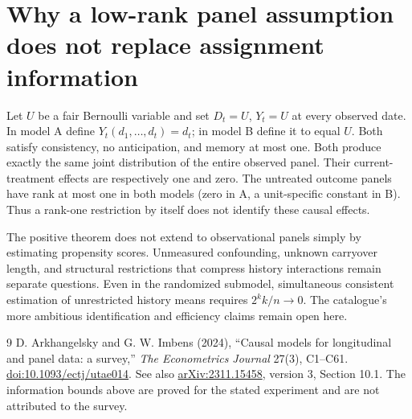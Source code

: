 \documentclass[11pt,a4paper]{article}
\theoremstyle{remark}
\begin{document}
\section{Why a low-rank panel assumption does not replace assignment information}
Let $U$ be a fair Bernoulli variable and set $D_t=U$, $Y_t=U$ at every observed date. In model A define $Y_t(d_1,\ldots,d_t)=d_t$; in model B define it to equal $U$. Both satisfy consistency, no anticipation, and memory at most one. Both produce exactly the same joint distribution of the entire observed panel. Their current-treatment effects are respectively one and zero. The untreated outcome panels have rank at most one in both models (zero in A, a unit-specific constant in B). Thus a rank-one restriction by itself does not identify these causal effects.

The positive theorem does not extend to observational panels simply by estimating propensity scores. Unmeasured confounding, unknown carryover length, and structural restrictions that compress history interactions remain separate questions. Even in the randomized submodel, simultaneous consistent estimation of unrestricted history means requires $2^k k/n\to0$. The catalogue's more ambitious identification and efficiency claims remain open here.

\begin{thebibliography}{9}
 D. Arkhangelsky and G. W. Imbens (2024), ``Causal models for longitudinal and panel data: a survey,'' \emph{The Econometrics Journal} 27(3), C1--C61. \href{https://doi.org/10.1093/ectj/utae014}{doi:10.1093/ectj/utae014}. See also \href{https://arxiv.org/abs/2311.15458}{arXiv:2311.15458}, version 3, Section 10.1. The information bounds above are proved for the stated experiment and are not attributed to the survey.
\end{thebibliography}
\end{document}
